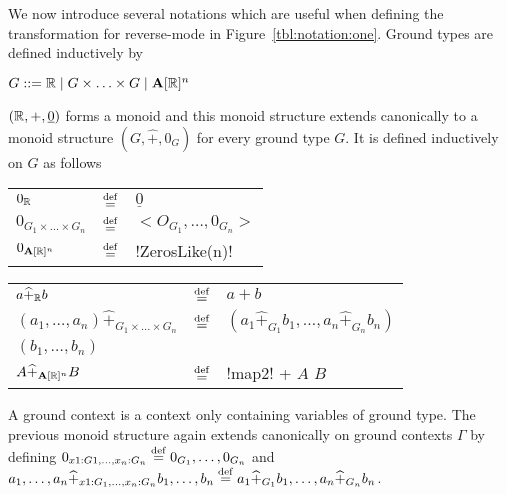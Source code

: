 

\begin{notation}
We now introduce several notations which are useful when defining the transformation for reverse-mode in Figure~\ref{tbl:notation:one}.
Ground types are defined inductively by
\begin{center}
    $G::= \mathbb{R} \mid G\times \ldots \times G \mid \mathbf{A}[\mathbb{R}]^{n}$
\end{center} 

$(\mathbb{R},+,\underline{0})$ forms a monoid and this monoid structure extends canonically 
to a monoid structure $(G,\widehat{+},0_G)$ for every ground type $G$. 
It is defined inductively on $G$ as follows

\begin{tabular}{l c l}
    $0_{\mathbb{R}}$  & $\stackrel {\mathrm{def}}=$ & $\underline{0}$ \\
    $0_{G_1\times \ldots \times G_n}$ & $\stackrel {\mathrm{def}}=$ &  $< O_{G_1},\ldots, 0_{G_n} >$ \\
    $0_{\mathbf{A}[\mathbb{R}]^{n}}$& $\stackrel {\mathrm{def}}=$ & !ZerosLike(n)!
\end{tabular}
\begin{tabular}{l c l}
    $a\widehat{+}_{\mathbb{R}} b$ & $\stackrel {\mathrm{def}}=$ & $ a+b$ \\
    $(a_1,\ldots,a_n)\widehat{+}_{G_1\times\ldots\times G_n}$ & $\stackrel {\mathrm{def}}=$ & $(a_1\widehat{+}_{G_1}b_1,\ldots,a_n\widehat{+}_{G_n}b_n)$ \\
    $(b_1,\ldots,b_n)$ && \\
    $A\widehat{+}_{\mathbf{A}[\mathbb{R}]^{n}}B $ & $\stackrel {\mathrm{def}}=$ & !map2! + $A$ $B$ 
\end{tabular}

A ground context is a context only containing variables of ground type.
The previous monoid structure again extends canonically on ground contexts $\Gamma$ by defining
$0_{x1:G1,\ldots,x_n:G_n}\stackrel {\mathrm{def}}= 0_{G_1},\ldots,0_{G_n}$ and 
$a_1,\ldots,a_n\widehat{+}_{x1:G_1,\ldots, x_n:G_n}b_1,\ldots,b_n\stackrel {\mathrm{def}}= a_1\widehat{+}_{G_1}b_1,\ldots,a_n\widehat{+}_{G_n}b_n$.

\end{notation}

